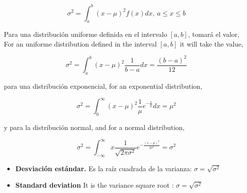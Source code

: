 \begin{equation*}
\sigma^2 = \int_a^b (x-\mu)^2f(x)dx, \ a\leqslant x \leqslant b
\end{equation*}
\begin{paracol}{2}
Para una distribución uniforme definida en el intervalo $[a,b]$, tomará el valor,
\switchcolumn
For an uniforme distribution defined in the interval $[a,b]$ it will take the value,
\end{paracol}
\begin{equation*}
\sigma^2 = \int_a^b (x-\mu)^2\frac{1}{b-a}dx = \frac{(b-a)^2}{12}
\end{equation*}
\begin{paracol}{2}
para una distribución exponencial,
\switchcolumn
for an exponential distribution,
\end{paracol}
\begin{equation*}
\sigma^2 = \int_0^{\infty}(x-\mu)^2\frac{1}{\mu}e^{-\frac{x}{\mu}}dx = \mu^2
\end{equation*}
\begin{paracol}{2}
y para la distribución normal,
\switchcolumn
and for a normal distribution,
\end{paracol}
\begin{equation*}
\sigma^2 = \int_{-\infty}^{\infty}x \frac{1}{\sqrt{2\pi\sigma^2}}e^{-\frac{(x-\mu)^2}{2\sigma^2}}= \sigma^2
\end{equation*}
\begin{paracol}{2}
\begin{itemize}
\item \textbf{Desviación estándar.}  Es la raíz cuadrada de la varianza: $\sigma =\sqrt{\sigma^2}$  
\end{itemize}
\switchcolumn
\begin{itemize}
\item \textbf{Standard deviation}  It is the variance square root : $\sigma =\sqrt{\sigma^2}$
\end{itemize}  
\end{paracol}


